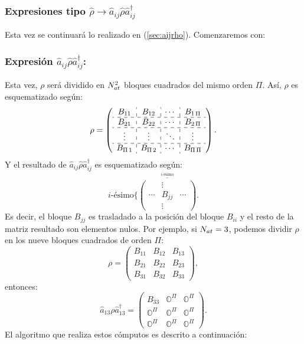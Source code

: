 \subsubsection{Expresiones tipo $\hat{\rho}\rightarrow \hat{a}_{ij}\hat{\rho}\hat{a}_{ij}^{\dag}$}\label{sec:expre_atomicas_orden2} \quad Esta vez se continuar\'a lo realizado en (\ref{sec:aijrho}). Comenzaremos con:
\subsubsection*{Expresi\'on $\hat{a}_{ij}\hat{\rho}\hat{a}_{ij}^{\dag}$: } \quad Esta vez, $\rho$ ser\'a dividido en $N_{at}^2$ bloques cuadrados del mismo orden $\Pi$. As\'i, $\rho$ es esquematizado seg\'un:\begin{equation}\rho=\left(
 \begin{array}{c:c:c:c}
B_{11}&B_{12}&\cdots&B_{1\,\Pi}\\\hdashline
B_{21}&B_{22}&\cdots&B_{2\,\Pi}\\\hdashline
\vdots &\vdots &\ddots &\vdots \\\hdashline
B_{\Pi\,1}&B_{\Pi\,2}&\cdots&B_{\Pi\,\Pi}
 \end{array}\right).
\end{equation}
Y el resultado de $\hat{a}_{ij}\hat{\rho}\hat{a}_{ij}^{\dag}$ es esquematizado seg\'un:\begin{equation}
 \mbox{$i$-\'esimo}\{
\overset{\overbrace{}^{ \mbox{$i$-\'esimo} }}{\left(\begin{array}{ccc}
&\vdots&\\
\cdots&B_{jj}&\cdots\\
&\vdots&
\end{array}
\right)}.
\end{equation}
Es decir, el bloque $B_{jj}$ es trasladado a la posici\'on del bloque $B_{ii}$ y el resto de la matriz resultado son elementos nulos. Por ejemplo, si $N_{at}=3$, podemos dividir $\rho$ en los nueve bloques cuadrados de orden $\Pi$:
$$\rho=\left(\begin{array}{ccc}
B_{11}&B_{12}&B_{13}\\
B_{21}&B_{22}&B_{23}\\
B_{31}&B_{32}&B_{33}
\end{array}\right),$$
entonces:
$$\hat{a}_{13}\rho\hat{a}^{\dag}_{13}=\left(
\begin{array}{ccc}
 B_{33} & \mathbb{O}^\Pi& \mathbb{O}^\Pi\\
\mathbb{O}^\Pi&\mathbb{O}^\Pi&\mathbb{O}^\Pi\\ 
\mathbb{O}^\Pi&\mathbb{O}^\Pi&\mathbb{O}^\Pi
\end{array}\right).$$
\quad El algoritmo que realiza estos c\'omputos es descrito a continuaci\'on:

